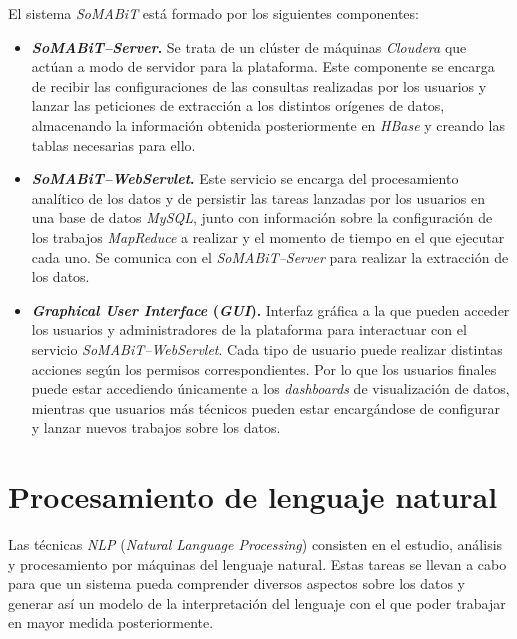 
El sistema \textit{SoMABiT} está formado por los siguientes componentes:

\begin{itemize}
    \item \textbf{\textit{SoMABiT--Server}.} Se trata de un clúster de máquinas \textit{Cloudera} que actúan a modo de servidor para la plataforma. Este componente se encarga de recibir las configuraciones de las consultas realizadas por los usuarios y lanzar las peticiones de extracción a los distintos orígenes de datos, almacenando la información obtenida posteriormente en \textit{HBase} y creando las tablas necesarias para ello.

    \item \textbf{\textit{SoMABiT--WebServlet}.} Este servicio se encarga del procesamiento analítico de los datos y de persistir las tareas lanzadas por los usuarios en una base de datos \textit{MySQL}, junto con información sobre la configuración de los trabajos \textit{MapReduce} a realizar y el momento de tiempo en el que ejecutar cada uno. Se comunica con el \textit{SoMABiT--Server} para realizar la extracción de los datos.

    \item \textbf{\textit{Graphical User Interface} (\textit{GUI}).} Interfaz gráfica a la que pueden acceder los usuarios y administradores de la plataforma para interactuar con el servicio \textit{SoMABiT--WebServlet}. Cada tipo de usuario puede realizar distintas acciones según los permisos correspondientes. Por lo que los usuarios finales puede estar accediendo únicamente a los \textit{dashboards} de visualización de datos, mientras que usuarios más técnicos pueden estar encargándose de configurar y lanzar nuevos trabajos sobre los datos.
\end{itemize}

\section{Procesamiento de lenguaje natural}

Las técnicas \textit{NLP} (\textit{Natural Language Processing}) consisten en el estudio, análisis y procesamiento por máquinas del lenguaje natural. Estas tareas se llevan a cabo para que un sistema pueda comprender diversos aspectos sobre los datos y generar así un modelo de la interpretación del lenguaje con el que poder trabajar en mayor medida posteriormente.

